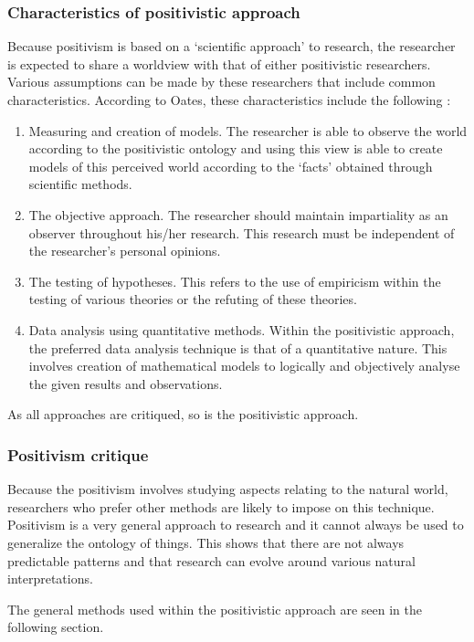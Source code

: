 \subsubsection{Characteristics of positivistic approach}
Because positivism is based on a ‘scientific approach’ to research, the researcher is expected to share a worldview with that of either positivistic researchers. Various assumptions can be made by these researchers that include common characteristics. According to Oates, these characteristics include the following \citep{OatesJ2006}: 
\begin{enumerate}[label=\roman*.]
	\item Measuring and creation of models. The researcher is able to observe the world according to the positivistic ontology and using this view is able to create models of this perceived world according to the ‘facts’ obtained through scientific methods.
	\item The objective approach. The researcher should maintain impartiality as an observer throughout his/her research. This research must be independent of the researcher’s personal opinions.
	\item The testing of hypotheses. This refers to the use of empiricism within the testing of various theories or the refuting of these theories.
	\item Data analysis using quantitative methods. Within the positivistic approach, the preferred data analysis technique is that of a quantitative nature. This involves creation of mathematical models to logically and objectively analyse the given results and observations.
\end{enumerate}

As all approaches are critiqued, so is the positivistic approach. 

\subsubsection{Positivism critique}
Because the positivism involves studying aspects relating to the natural world, researchers who prefer other methods are likely to impose on this technique. Positivism is a very general approach to research and it cannot always be used to generalize the ontology of things. This shows that there are not always predictable patterns and that research can evolve around various natural interpretations.

The general methods used within the positivistic approach are seen in the following section.

